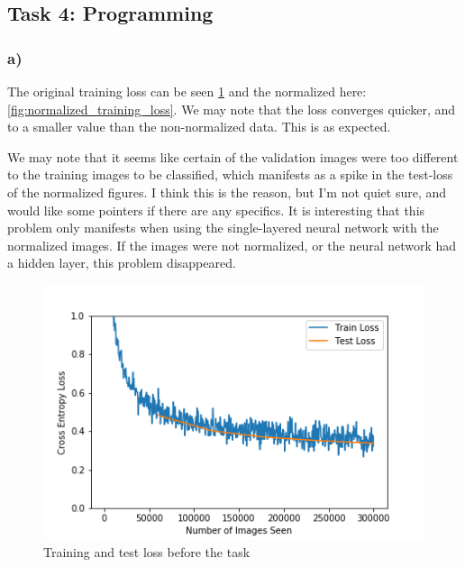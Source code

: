 \newpage
\subsection{Task 4: Programming}
\subsubsection*{a)}
The original training loss can be seen \cref{fig:training_loss} and the normalized here: \cref{fig:normalized_training_loss}. We may note that the loss converges quicker, and to a smaller value than the non-normalized data. This is as expected. 

We may note that it seems like certain of the validation images were too different to the training images to be classified, which manifests as a spike in the test-loss of the normalized figures. I think this is the reason, but I'm not quiet sure, and would like some pointers if there are any specifics. It is interesting that this problem only manifests when using the single-layered neural network with the normalized images. If the images were not normalized, or the neural network had a hidden layer, this problem disappeared. 

\begin{figure}[]
    \centering
    \includegraphics[width=1.00\textwidth]{figures/training/original_training_loss.png}
    \caption{Training and test loss before the task}
    \label{fig:training_loss}
\end{figure}

